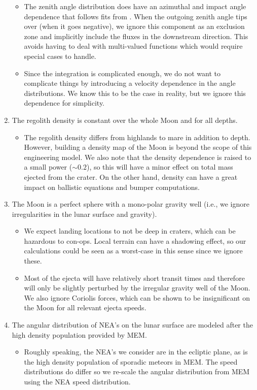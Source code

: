\documentclass{hitec}
\numberwithin{equation}{section}
\begin{document}
\begin{enumerate}
\begin{itemize}
		\item The zenith angle distribution does have an azimuthal and impact angle dependence that follows fits from \cite{gault1978experimental}. When the outgoing zenith angle tips over (when it goes negative), we ignore this component as an exclusion zone and implicitly include the fluxes in the downstream direction. This avoids having to deal with multi-valued functions which would require special cases to handle.
		\item Since the integration is complicated enough, we do not want to complicate things by introducing a velocity dependence in the angle distributions. We know this to be the case in reality, but we ignore this dependence for simplicity.
	\end{itemize}
	\item The regolith density is constant over the whole Moon and for all depths.
	\begin{itemize}
		\item The regolith density differs from highlands to mare in addition to depth. However, building a density map of the Moon is beyond the scope of this engineering model. We also note that the density dependence is raised to a small power ($\sim 0.2$), so this will have a minor effect on total mass ejected from the crater. On the other hand, density can have a great impact on ballistic equations and bumper computations.
	\end{itemize}
	\item The Moon is a perfect sphere with a mono-polar gravity well (i.e., we ignore irregularities in the lunar surface and gravity).
	\begin{itemize}
		\item We expect landing locations to not be deep in craters, which can be hazardous to con-ops. Local terrain can have a shadowing effect, so our calculations could be seen as a worst-case in this sense since we ignore these.
		\item Most of the ejecta will have relatively short transit times and therefore will only be slightly perturbed by the irregular gravity well of the Moon. We also ignore Coriolis forces, which can be shown to be insignificant on the Moon for all relevant ejecta speeds.
	\end{itemize}
	\item The angular distribution of NEA's on the lunar surface are modeled after the high density population provided by MEM.
	\begin{itemize}
		\item Roughly speaking, the NEA's we consider are in the ecliptic plane, as is the high density population of sporadic meteors in MEM. The speed distributions do differ so we re-scale the angular distribution from MEM using the NEA speed distribution.
	\end{itemize}
\end{enumerate}
\end{document}
